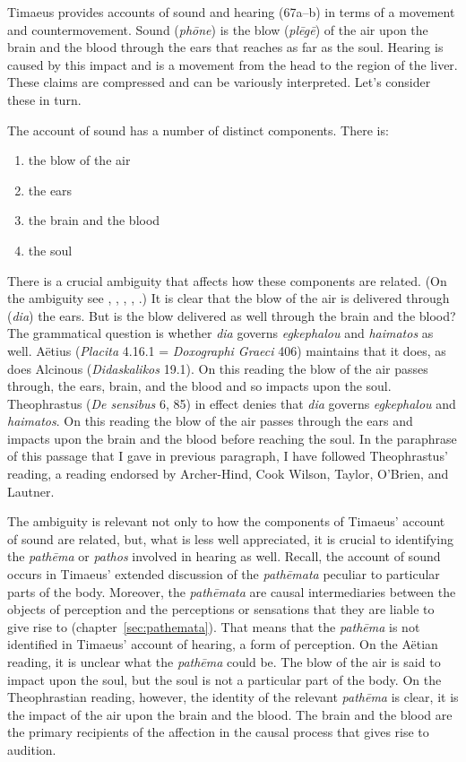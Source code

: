 Timaeus provides accounts of sound and hearing (67a--b) in terms of a movement and countermovement. Sound (\emph{phōne}) is the blow (\emph{plēgē}) of the air upon the brain and the blood through the ears that reaches as far as the soul. Hearing is caused by this impact and is a movement from the head to the region of the liver. These claims are compressed and can be variously interpreted. Let's consider these in turn.

The account of sound has a number of distinct components. There is:
\begin{enumerate}
	\item the blow of the air
	\item the ears
	\item the brain and the blood
	\item the soul
\end{enumerate}

There is a crucial ambiguity that affects how these components are related. (On the ambiguity see \citealt[246 n7]{Archer-Hind:1888qd}, \citealt[99--100]{Cook-Wilson:1889cs}, \citealt[476--7]{Taylor:1928qb}, \citealt[142 n38]{OBrien:1984ji}, \citealt[235, n1]{Lautner:2005aa}.) It is clear that the blow of the air is delivered through (\emph{dia}) the ears. But is the blow delivered as well through the brain and the blood? The grammatical question is whether \emph{dia} governs \emph{egkephalou} and \emph{haimatos} as well. Aëtius (\emph{Placita} 4.16.1 = \emph{Doxographi Graeci} 406) maintains that it does, as does Alcinous (\emph{Didaskalikos} 19.1). On this reading the blow of the air passes through, the ears, brain, and the blood and so impacts upon the soul. Theophrastus (\emph{De sensibus} 6, 85) in effect denies that \emph{dia} governs \emph{egkephalou} and \emph{haimatos}. On this reading the blow of the air passes through the ears and impacts upon the brain and the blood before reaching the soul. In the paraphrase of this passage that I gave in previous paragraph, I have followed Theophrastus' reading, a reading endorsed by Archer-Hind, Cook Wilson, Taylor, O'Brien, and Lautner. 

The ambiguity is relevant not only to how the components of Timaeus' account of sound are related, but, what is less well appreciated, it is crucial to identifying the \emph{pathēma} or \emph{pathos} involved in hearing as well. Recall, the account of sound occurs in Timaeus' extended discussion of the \emph{pathēmata} peculiar to particular parts of the body. Moreover, the \emph{pathēmata} are causal intermediaries between the objects of perception and the perceptions or sensations that they are liable to give rise to (chapter~\ref{sec:pathemata}). That means that the \emph{pathēma} is not identified in Timaeus' account of hearing, a form of perception. On the Aëtian reading, it is unclear what the \emph{pathēma} could be. The blow of the air is said to impact upon the soul, but the soul is not a particular part of the body. On the Theophrastian reading, however, the identity of the relevant \emph{pathēma} is clear, it is the impact of the air upon the brain and the blood. The brain and the blood are the primary recipients of the affection in the causal process that gives rise to audition.

